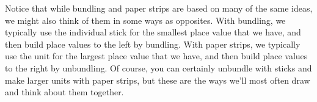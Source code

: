 \documentclass{ximera}
\begin{document}
%
%
%
%	
%
%
%
%
%
%
%

Notice that while bundling and paper strips are based on many of the same ideas, we might also think of them in some ways as opposites. With bundling, we typically use the individual stick for the smallest place value that we have, and then build place values to the left by bundling. With paper strips, we typically use the unit for the largest place value that we have, and then build place values to the right by unbundling. Of course, you can certainly unbundle with sticks and make larger units with paper strips, but these are the ways we'll most often draw and think about them together.
\end{document}

